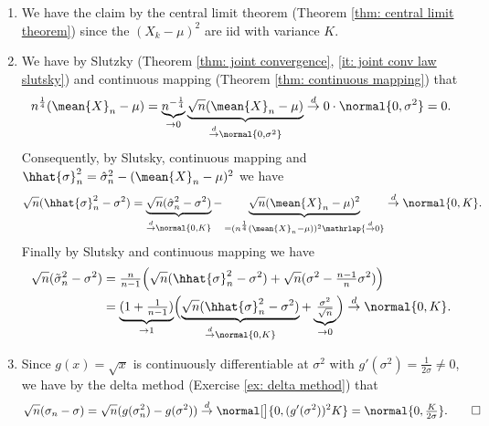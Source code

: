 \begin{solution}
   \begin{enumerate}[wide=0pt]
        \item[\ref{it: (normality of variance estimation) theoretical
        estimator}] We have the claim by the central limit theorem (Theorem
        \ref{thm: central limit theorem}) since the \((X_k - \mu)^2\) are iid
        with variance \(K\).

        \item[\ref{it: (normality of variance estimation) realistic estimator}]
        We have by Slutzky (Theorem \ref{thm: joint convergence}, \ref{it: joint conv law slutsky})
        and continuous mapping (Theorem \ref{thm: continuous mapping}) that
        \[
            n^{\frac14} (\mean{X}_n - \mu)
            = \underbrace{n^{-\frac14}}_{\to 0} \underbrace{\sqrt{n}(\mean{X}_n - \mu)}_{\overset{d}\to \normal{0, \sigma^2}}
            \overset{d}\to 0 \cdot \normal{0, \sigma^2} = 0.
        \]
        Consequently, by Slutsky, continuous mapping and \(\hhat{\sigma}_n^2=\hat\sigma_n^2 - (\mean{X}_n - \mu)^2\) we have
        \[
            \sqrt{n}(\hhat{\sigma}_n^2 - \sigma^2)
            = \underbrace{\sqrt{n}(\hat\sigma_n^2 - \sigma^2)}_{\overset{d}\to \normal{0, K}}
            - \underbrace{\sqrt{n}(\mean{X}_n - \mu)^2}_{=(n^{\frac14}(\mean{X}_n - \mu))^2 \mathrlap{\overset{d}\to 0}}
            \overset{d}\to \normal{0, K}.
        \]
        Finally by Slutsky and continuous mapping we have
        \begin{align*}
            \sqrt{n} (\tilde\sigma_n^2 - \sigma^2)
            &= \tfrac{n}{n-1}\Bigl( \sqrt{n}(\hhat{\sigma}_n^2 - \sigma^2) + \sqrt{n}(\sigma^2 - \tfrac{n-1}n \sigma^2)\Bigr)
            \\
            &= \underbrace{(1 + \tfrac1{n-1})}_{\to 1}\Bigl(\underbrace{\sqrt{n}(\hhat{\sigma}_n^2 - \sigma^2)}_{\overset{d}\to \normal{0, K}} + \underbrace{\tfrac{\sigma^2}{\sqrt{n}}}_{\to 0}\Bigr)
            \overset{d}\to \normal{0, K}.
        \end{align*}
        \item[\ref{it: (normality of variance estimation) standard deviation}]
        Since \(g(x) = \sqrt{x}\) is continuously differentiable at \(\sigma^2\) with \(g'(\sigma^2) = \frac{1}{2\sigma}\neq 0\), we have by the delta method (Exercise \ref{ex: delta method}) that
        \[
            \sqrt{n}(\sigma_n - \sigma)
            = \sqrt{n}(g(\sigma_n^2) - g(\sigma^2))
            \overset{d}\to \normal[\big]{0, (g'(\sigma^2))^2 K} = \normal{0, \tfrac{K}{2\sigma}}.
            \qedhere
        \]
        \end{enumerate} 
\end{solution}


